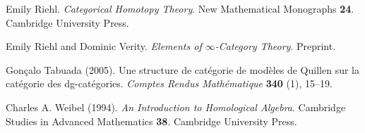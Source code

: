 \begin{thebibliography}{MMMM}
     Emily Riehl.
    \emph{Categorical Homotopy Theory}.
    New Mathematical Monographs \textbf{24}.
    Cambridge University Press.

     Emily Riehl and Dominic Verity.
    \emph{Elements of $\infty$-Category Theory}. Preprint.

     Gonçalo Tabuada (2005).
    Une structure de catégorie de modèles de Quillen sur la catégorie des dg-catégories.
    \emph{Comptes Rendus Mathématique} \textbf{340} (1), 15--19.

     Charles A. Weibel (1994).
    \emph{An Introduction to Homological Algebra}.
    Cambridge Studies in Advanced Mathematics \textbf{38}.
    Cambridge University Press.
\end{thebibliography}

